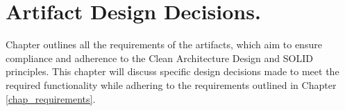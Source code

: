 \chapter{Artifact Design Decisions.} \label{chap_designing_artifacts}

Chapter  outlines all the requirements of the artifacts, which
aim to ensure compliance and adherence to the Clean Architecture Design and SOLID
principles. This chapter will discuss specific design decisions made to meet the required
functionality while adhering to the requirements outlined in Chapter
\ref{chap_requirements}.






